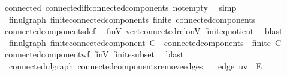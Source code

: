 \begin{isabellebody}
%
\isatagproof
{}\isamarkupfalse%
\ connected\ connected{\isacharunderscore}{\kern0pt}iff{\isacharunderscore}{\kern0pt}connected{\isacharunderscore}{\kern0pt}components\ not{\isacharunderscore}{\kern0pt}empty\ \isamarkupfalse%
\ simp%
\endisatagproof
{\isafoldproof}%
%
\isadelimproof
\isanewline
%
\endisadelimproof
\isanewline
{}\isamarkupfalse%
\ {\isacharparenleft}{\kern0pt}\ fin{\isacharunderscore}{\kern0pt}ulgraph{\isacharparenright}{\kern0pt}\ finite{\isacharunderscore}{\kern0pt}connected{\isacharunderscore}{\kern0pt}components{\isacharcolon}{\kern0pt}\ {\isachardoublequoteopen}finite\ connected{\isacharunderscore}{\kern0pt}components{\isachardoublequoteclose}\isanewline
%
\isadelimproof
\ \ %
\endisadelimproof
%
\isatagproof
{}\isamarkupfalse%
\ connected{\isacharunderscore}{\kern0pt}components{\isacharunderscore}{\kern0pt}def\ \isamarkupfalse%
\ finV\ vert{\isacharunderscore}{\kern0pt}connected{\isacharunderscore}{\kern0pt}rel{\isacharunderscore}{\kern0pt}on{\isacharunderscore}{\kern0pt}V\ finite{\isacharunderscore}{\kern0pt}quotient\ \isamarkupfalse%
\ blast%
\endisatagproof
{\isafoldproof}%
%
\isadelimproof
\isanewline
%
\endisadelimproof
\isanewline
{}\isamarkupfalse%
\ {\isacharparenleft}{\kern0pt}\ fin{\isacharunderscore}{\kern0pt}ulgraph{\isacharparenright}{\kern0pt}\ finite{\isacharunderscore}{\kern0pt}connected{\isacharunderscore}{\kern0pt}component{\isacharcolon}{\kern0pt}\ {\isachardoublequoteopen}C\ {\isasymin}\ connected{\isacharunderscore}{\kern0pt}components\ {\isasymLongrightarrow}\ finite\ C{\isachardoublequoteclose}\isanewline
%
\isadelimproof
\ \ %
\endisadelimproof
%
\isatagproof
{}\isamarkupfalse%
\ connected{\isacharunderscore}{\kern0pt}component{\isacharunderscore}{\kern0pt}wf\ finV\ finite{\isacharunderscore}{\kern0pt}subset\ \isamarkupfalse%
\ blast%
\endisatagproof
{\isafoldproof}%
%
\isadelimproof
\isanewline
%
\endisadelimproof
\isanewline
{}\isamarkupfalse%
\ {\isacharparenleft}{\kern0pt}\ connected{\isacharunderscore}{\kern0pt}ulgraph{\isacharparenright}{\kern0pt}\ connected{\isacharunderscore}{\kern0pt}components{\isacharunderscore}{\kern0pt}remove{\isacharunderscore}{\kern0pt}edges{\isacharcolon}{\kern0pt}\isanewline
\ \ \ edge{\isacharcolon}{\kern0pt}\ {\isachardoublequoteopen}{\isacharbraceleft}{\kern0pt}u{\isacharcomma}{\kern0pt}v{\isacharbraceright}{\kern0pt}\ {\isasymin}\ E{\isachardoublequoteclose}\isanewline

\end{isabellebody}

